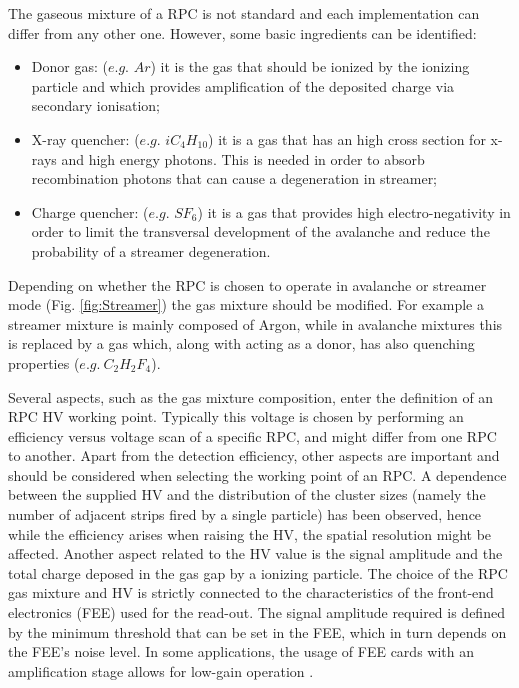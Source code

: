 The gaseous mixture of a RPC is not standard and each implementation can differ from any other one.
However, some basic ingredients can be identified:
\begin{itemize}
\item Donor gas: ($e.g.$ $Ar$) it is the gas that should be ionized by the ionizing particle and which provides amplification of the deposited charge via secondary ionisation;
\item X-ray quencher: ($e.g.$ $iC_4H_{10}$) it is a gas that has an high cross section for x-rays and high energy photons. This is needed in order to absorb recombination photons that can cause a degeneration in streamer;
\item Charge quencher: ($e.g.$ $SF_6$) it is a gas that provides high electro-negativity in order to limit the transversal development of the avalanche and reduce the probability of a streamer degeneration.
\end{itemize}

Depending on whether the RPC is chosen to operate in avalanche or streamer mode (Fig. \ref{fig:Streamer}) the gas mixture should be modified.
For example a streamer mixture is mainly composed of Argon, while in avalanche mixtures this is replaced by a gas which, along with acting as a donor, has also quenching properties ($e.g.\ C_2H_2F_4$).

Several aspects, such as the gas mixture composition, enter the definition of an RPC HV working point.
Typically this voltage is chosen by performing an efficiency versus voltage scan of a specific RPC, and might differ from one RPC to another.
Apart from the detection efficiency, other aspects are important and should be considered when selecting the working point of an RPC.
A dependence between the supplied HV and the distribution of the cluster sizes (namely the number of adjacent strips fired by a single particle) has been observed, hence while the efficiency arises when raising the HV, the spatial resolution might be affected.
Another aspect related to the HV value is the signal amplitude and the total charge deposed in the gas gap by a ionizing particle.
The choice  of the RPC gas mixture and HV is strictly connected to the characteristics of the front-end electronics (FEE) used for the read-out. 
The signal amplitude required is defined by the minimum threshold that can be set in the FEE, which in turn depends on the FEE’s noise level. 
In some applications, the usage of FEE cards with an amplification stage allows for low-gain operation \cite{Marchisone:2017bcb}.

